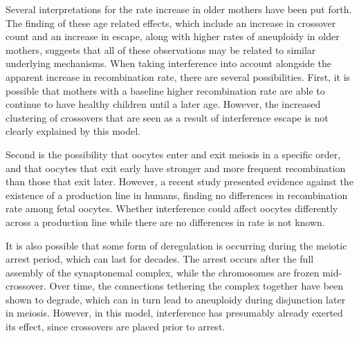 Several interpretations for the rate increase in older mothers have been put forth.
The finding of these age related effects, which include an increase in crossover count and an increase in escape, along with higher rates of aneuploidy in older mothers\cite{Hassold2001}, suggests that all of these observations may be related to similar underlying mechanisms.
When taking interference into account alongside the apparent increase in recombination rate, there are several possibilities.
First, it is possible that mothers with a baseline higher recombination rate are able to continue to have healthy children until a later age\cite{Kong2004}.
However, the increased clustering of crossovers that are seen as a result of interference escape is not clearly explained by this model.

Second is the possibility that oocytes enter and exit meiosis in a specific order, and that oocytes that exit early have stronger and more frequent recombination than those that exit later.
However, a recent study presented evidence against the existence of a production line in humans, finding no differences in recombination rate among fetal oocytes\cite{Rowsey2014}.
Whether interference could affect oocytes differently across a production line while there are no differences in rate is not known.

It is also possible that some form of deregulation is occurring during the meiotic arrest period, which can last for decades.
The arrest occurs after the full assembly of the synaptonemal complex, while the chromosomes are frozen mid-crossover.
Over time, the connections tethering the complex together have been shown to degrade\cite{Nagaoka2012}, which can in turn lead to aneuploidy during disjunction later in meiosis.
However, in this model, interference has presumably already exerted its effect, since crossovers are placed prior to arrest.


